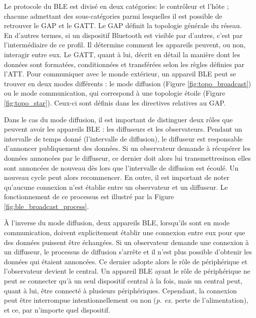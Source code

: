 Le protocole du \acs{BLE} est divisé en deux catégories: le contrôleur et l'hôte ; chacune admettant des sous-catégories parmi lesquelles il est possible de retrouver le \ac{GAP} et le \ac{GATT}. Le \acs{GAP} définit la topologie générale du réseau. En d'autres termes, si un dispositif Bluetooth est visible par d'autres, c'est par l'intermédiaire de ce profil. Il détermine comment les appareils peuvent, ou non, interagir entre eux. Le \acs{GATT}, quant à lui, décrit en détail la manière dont les données sont formatées, conditionnées et transférées selon les règles définies par l'\ac{ATT}. Pour communiquer avec le monde extérieur, un appareil \acs{BLE} peut se trouver en deux modes différents : le mode diffusion (Figure \ref{fig:topo_broadcast}) ou le mode communication, qui correspond à une topologie étoile (Figure \ref{fig:topo_star}). Ceux-ci sont définis dans les directives relatives au \acs{GAP}.

Dans le cas du mode diffusion, il est important de distinguer deux rôles que peuvent avoir les appareils \acs{BLE} : les diffuseurs et les observateurs. Pendant un intervalle de temps donné (l'intervalle de diffusion), le diffuseur est responsable d'annoncer publiquement des données. Si un observateur demande à récupérer les données annoncées par le diffuseur, ce dernier doit alors lui transmettre\textemdash sinon elles sont annoncées de nouveau dès lors que l'intervalle de diffusion est écoulé. Un nouveau cycle peut alors recommencer. En outre, il est important de noter qu'aucune connexion n'est établie entre un observateur et un diffuseur. Le fonctionnement de ce processus est illustré par la Figure \ref{fig:ble_broadcast_process}.

À l'inverse du mode diffusion, deux appareils \acs{BLE}, lorsqu'ils sont en mode communication, doivent explicitement établir une connexion entre eux pour que des données puissent être échangées. Si un observateur demande une connexion à un diffuseur, le processus de diffusion s'arrête et il n'est plus possible d'obtenir les données qui étaient annoncées. Ce dernier adopte alors le rôle de périphérique et l'observateur devient le central. Un appareil \acs{BLE} ayant le rôle de périphérique ne peut se connecter qu'à un seul dispositif central à la fois, mais un central peut, quant à lui, être connecté à plusieurs périphériques. Cependant, la connexion peut être interrompue intentionnellement ou non (\textit{p. ex.} perte de l'alimentation), et ce, par n'importe quel dispositif.

